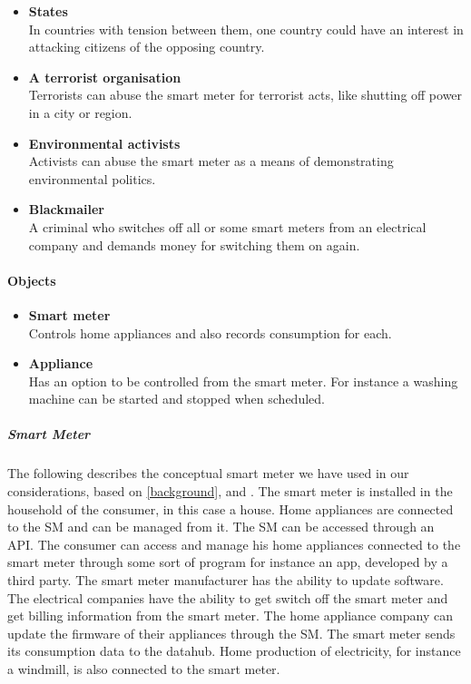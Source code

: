 \begin{itemize}
\begin{itemize}
\item \textbf{States}\\ In countries with tension between them, one country could have an interest in attacking citizens of the opposing country.
\item \textbf{A terrorist organisation}\\ Terrorists can abuse the smart meter for terrorist acts, like shutting off power in a city or region.
\item \textbf{Environmental activists}\\ Activists can abuse the smart meter as a means of demonstrating environmental politics.
\item \textbf{Blackmailer}\\ A criminal who switches off all or some smart meters from an electrical company and demands money for switching them on again.
\end{itemize}
\end{itemize}

\paragraph{Objects}
\begin{itemize}
\item \textbf{Smart meter}\\ Controls home appliances and also records consumption for each.
\item \textbf{Appliance}\\ Has an option to be controlled from the smart meter. For instance a washing machine can be started and stopped when scheduled.
\end{itemize}

\subparagraph{Smart Meter}
The following describes the conceptual smart meter we have used in our considerations, based on \cref{background}, \citet{tdlm} and \citet{smart_meter_survey}.
The smart meter is installed in the household of the consumer, in this case a house.
Home appliances are connected to the SM and can be managed from it.
The SM can be accessed through an API.
The consumer can access and manage his home appliances connected to the smart meter through some sort of program for instance an app, developed by a third party.
The smart meter manufacturer has the ability to update software.
The electrical companies have the ability to get switch off the smart meter and get billing information from the smart meter.
The home appliance company can update the firmware of their appliances through the SM.
The smart meter sends its consumption data to the datahub.
Home production of electricity, for instance a windmill, is also connected to the smart meter.
